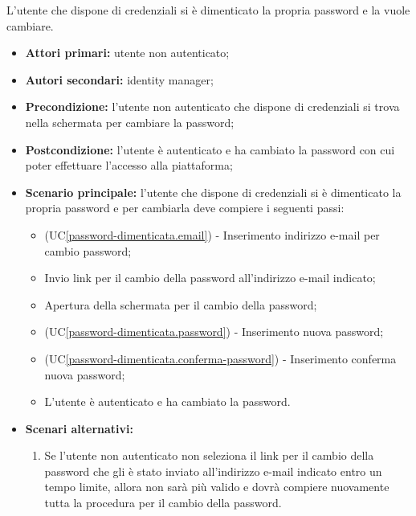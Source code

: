 \label{password-dimenticata}


L'utente che dispone di credenziali si è dimenticato la propria password e la vuole cambiare.
\begin{itemize}
    \item \textbf{Attori primari:} utente non autenticato;
    \item \textbf{Autori secondari:} identity manager;
    \item \textbf{Precondizione:} l'utente non autenticato che dispone di credenziali si trova nella schermata per cambiare la password;
    \item \textbf{Postcondizione:} l'utente è autenticato e ha cambiato la password con cui poter effettuare l'accesso alla piattaforma;
    \item \textbf{Scenario principale:} l'utente che dispone di credenziali si è dimenticato la propria password e per cambiarla deve compiere i seguenti passi:
    \begin{itemize}
        \item (UC\ref{password-dimenticata.email}) - Inserimento indirizzo e-mail per cambio password;
        \item Invio link per il cambio della password all'indirizzo e-mail indicato;
        \item Apertura della schermata per il cambio della password;
        \item (UC\ref{password-dimenticata.password}) - Inserimento nuova password;
        \item (UC\ref{password-dimenticata.conferma-password}) - Inserimento conferma nuova password;
        \item L'utente è autenticato e ha cambiato la password.
    \end{itemize}
	\item \textbf{Scenari alternativi:}
	\begin{enumerate}[label=\lett]
		\item Se l'utente non autenticato non seleziona il link per il cambio della password che gli è stato inviato all'indirizzo e-mail indicato entro un tempo limite, allora non sarà più valido e dovrà compiere nuovamente tutta la procedura per il cambio della password. 

\end{enumerate}
\end{itemize}
